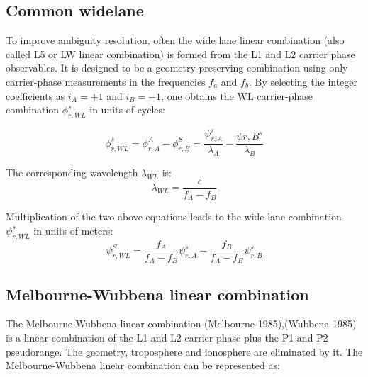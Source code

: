 


\subsection{Common widelane}
\begin{fullwidth}
To improve ambiguity resolution, often the wide lane linear combination (also called L5 or LW linear combination) is formed from the L1 and L2 carrier phase observables. It is designed to be a geometry-preserving combination using only carrier-phase measurements in the frequencies $f_a$ and $f_b$. By selecting the integer coefficients as $i_A = +1$ and $i_B = -1$, one obtains the WL carrier-phase combination $\phi_{r,WL}^s$ in units of cycles:
\end{fullwidth}
\begin{equation}
\phi_{r,WL}^s = \phi_{r,A}^A - \phi_{r,B}^S = \frac{\psi_{r,A}^s}{\lambda_A} - \frac{\psi{r,B}^s}{\lambda_B} \label{eq:wl_cycles}
\end{equation}

The corresponding wavelength $\lambda_{WL}$ is:
\begin{equation}
\lambda_{WL} = \frac{c}{f_A - f_B} 
    \label{eq:wl_wavelength}
\end{equation}

Multiplication of the two above equations leads to the wide-lane combination $\psi_{r,WL}^s$ in units of meters:
\begin{equation}
\psi_{r,WL}^S = \frac{f_A}{f_A-f_B}\psi_{r,A}^s - \frac{f_B}{f_A-f_B}\psi_{r,B}^s
\end{equation}

\subsection{Melbourne-Wubbena linear combination}
The Melbourne-Wubbena linear combination (Melbourne 1985),(Wubbena 1985) is a linear combination of the L1 and L2 carrier phase plus the P1 and P2 pseudorange. The geometry, troposphere and ionosphere are eliminated by it. The Melbourne-Wubbena linear combination can be represented as:

